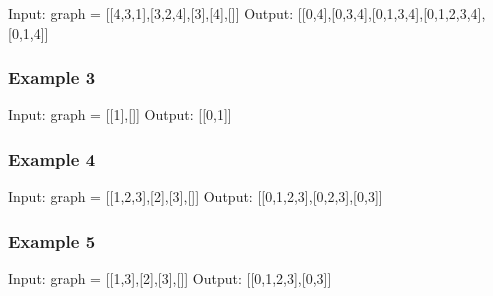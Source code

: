 \documentclass[letterpaper,12pt,english]{book}
\begin{document}
\begin{sphinxVerbatim}[commandchars=\\\{\}]
Input: graph = [[4,3,1],[3,2,4],[3],[4],[]]
Output: [[0,4],[0,3,4],[0,1,3,4],[0,1,2,3,4],[0,1,4]]
\end{sphinxVerbatim}


\subsubsection{Example 3}
\label{\detokenize{Graph/797_All_Paths_From_Source_to_Target:example-3}}
\begin{sphinxVerbatim}[commandchars=\\\{\}]
Input: graph = [[1],[]]
Output: [[0,1]]
\end{sphinxVerbatim}


\subsubsection{Example 4}
\label{\detokenize{Graph/797_All_Paths_From_Source_to_Target:example-4}}
\begin{sphinxVerbatim}[commandchars=\\\{\}]
Input: graph = [[1,2,3],[2],[3],[]]
Output: [[0,1,2,3],[0,2,3],[0,3]]
\end{sphinxVerbatim}


\subsubsection{Example 5}
\label{\detokenize{Graph/797_All_Paths_From_Source_to_Target:example-5}}
\begin{sphinxVerbatim}[commandchars=\\\{\}]
Input: graph = [[1,3],[2],[3],[]]
Output: [[0,1,2,3],[0,3]]
\end{sphinxVerbatim}
\end{document}
